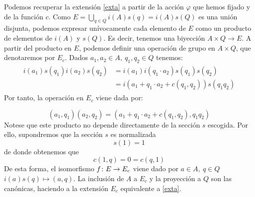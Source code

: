 Podemos recuperar la extensión \eqref{exta} a partir de la acción $\varphi$ que hemos fijado y de la función $c$. Como $E=\bigcup\limits_{q\in Q} i(A)s(q) = i(A)s(Q)$ es una unión disjunta, podemos expresar unívocamente cada elemento de $E$ como un producto de elementos de $i(A)$ y $s(Q)$. Es decir, tenemos una biyección $A\times Q \to E$. A partir del producto en $E$, podemos definir una operación de grupo en $A\times Q$, que denotaremos por $E_{c}$. Dados $a_1,a_2\in A, \ q_1,q_2\in Q$ tenemos:
\begin{align}\begin{split}
i(a_1)s(q_1)i(a_2)s(q_2) &= i(a_1)i(q_1\cdot a_2)s(q_1)s(q_2) \\ &= i(a_1+ q_1\cdot a_2 + c(q_1,q_2))s(q_1q_2)
\end{split}\end{align}
\noindent Por tanto, la operación en $E_c$ viene dada por:

\begin{equation}\label{extop}
(a_1,q_1)(a_2,q_2) = (a_1 + q_1\cdot a_2 + c(q_1,q_2),q_1q_2)
\end{equation}
Notese que este producto no depende directamente de la sección $s$ escogida. Por ello, supondremos que la sección $s$ es normalizada 
\begin{equation}
	s(1) = 1
\end{equation}
de donde obtenemos que
\begin{equation}\label{cocnorm}
	c(1,q) = 0 = c(q,1)
\end{equation}
De esta forma, el isomorfismo $f\colon E\to E_c$ viene dado por $a\in A,\ q\in Q$ $i(a)s(q) \mapsto (a,q)$. La inclusión de $A$ a $E_c$ y la proyección a $Q$ son las canónicas, haciendo a la extensión $E_c$ equivalente a \eqref{exta}.



